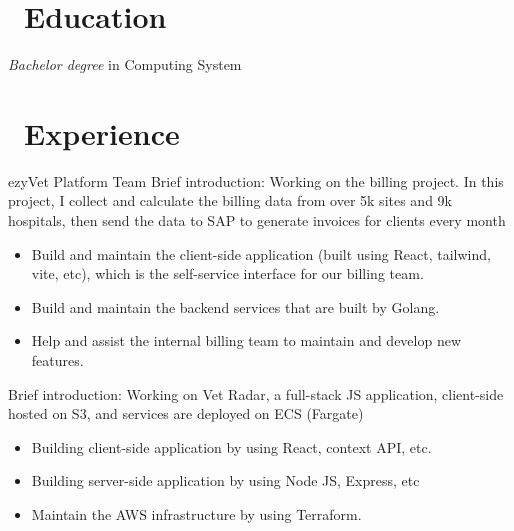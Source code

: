 \documentclass{resume}
\begin{document}



\section{\faGraduationCap\ Education}
\textit{Bachelor degree} in Computing System

\section{\faUsers\ Experience}
\role{Senior Software Engineer} {ezyVet Platform Team}
Brief introduction: Working on the billing project. In this project, I collect and calculate the billing data from over 5k sites and 9k hospitals, then send the data to SAP to generate invoices for clients every month
\begin{itemize}
  \item Build and maintain the client-side application (built using React, tailwind, vite, etc), which is the self-service interface for our billing team.
  \item Build and maintain the backend services that are built by Golang.
  \item Help and assist the internal billing team to maintain and develop new features.
\end{itemize}

Brief introduction: Working on Vet Radar, a full-stack JS application, client-side hosted on S3, and services are deployed on ECS (Fargate)
\begin{itemize}
  \item Building client-side application by using React, context API, etc.
  \item Building server-side application by using Node JS, Express, etc
  \item Maintain the AWS infrastructure by using Terraform.
\end{itemize}
\end{document}

